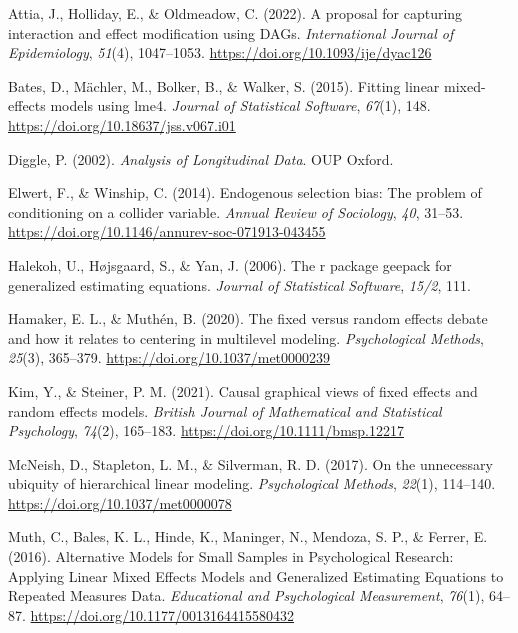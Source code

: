 \documentclass[
  12pt,
  a4paper,
]{article}
\newlength{\cslhangindent}
\newenvironment{CSLReferences}[2] %
 {\begin{list}{}{%
  \setlength{\itemindent}{0pt}
  \setlength{\leftmargin}{0pt}
  \setlength{\parsep}{0pt}
  \ifodd #1
   \setlength{\leftmargin}{\cslhangindent}
   \setlength{\itemindent}{-1\cslhangindent}
  \fi
  \setlength{\itemsep}{#2\baselineskip}}}
 {\end{list}}
\begin{document}
\label{refs}
\begin{CSLReferences}{1}{0}
Attia, J., Holliday, E., \& Oldmeadow, C. (2022). A proposal for
capturing interaction and effect modification using DAGs.
\emph{International Journal of Epidemiology}, \emph{51}(4), 1047--1053.
\url{https://doi.org/10.1093/ije/dyac126}

Bates, D., Mächler, M., Bolker, B., \& Walker, S. (2015). Fitting linear
mixed-effects models using {lme4}. \emph{Journal of Statistical
Software}, \emph{67}(1), 148.
\url{https://doi.org/10.18637/jss.v067.i01}

Diggle, P. (2002). \emph{Analysis of Longitudinal Data}. OUP Oxford.

Elwert, F., \& Winship, C. (2014). Endogenous selection bias: The
problem of conditioning on a collider variable. \emph{Annual Review of
Sociology}, \emph{40}, 31--53.
\url{https://doi.org/10.1146/annurev-soc-071913-043455}

Halekoh, U., Højsgaard, S., \& Yan, J. (2006). The r package geepack for
generalized estimating equations. \emph{Journal of Statistical
Software}, \emph{15/2}, 111.

Hamaker, E. L., \& Muthén, B. (2020). The fixed versus random effects
debate and how it relates to centering in multilevel modeling.
\emph{Psychological Methods}, \emph{25}(3), 365--379.
\url{https://doi.org/10.1037/met0000239}

Kim, Y., \& Steiner, P. M. (2021). Causal graphical views of fixed
effects and random effects models. \emph{British Journal of Mathematical
and Statistical Psychology}, \emph{74}(2), 165--183.
\url{https://doi.org/10.1111/bmsp.12217}

McNeish, D., Stapleton, L. M., \& Silverman, R. D. (2017). On the
unnecessary ubiquity of hierarchical linear modeling.
\emph{Psychological Methods}, \emph{22}(1), 114--140.
\url{https://doi.org/10.1037/met0000078}

Muth, C., Bales, K. L., Hinde, K., Maninger, N., Mendoza, S. P., \&
Ferrer, E. (2016). Alternative Models for Small Samples in Psychological
Research: Applying Linear Mixed Effects Models and Generalized
Estimating Equations to Repeated Measures Data. \emph{Educational and
Psychological Measurement}, \emph{76}(1), 64--87.
\url{https://doi.org/10.1177/0013164415580432}


\end{CSLReferences}
\end{document}
